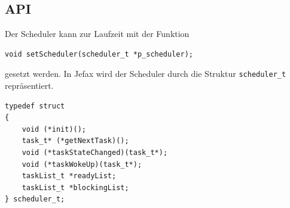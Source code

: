 \documentclass[fontsize=12pt, toc=bibliography, notitlepage]{scrreprt}
\begin{document}
\subsection{API}
\label{subsec:scheduler-api}
Der Scheduler kann zur Laufzeit mit der Funktion

\begin{lstlisting}[title=scheduler.h]
void setScheduler(scheduler_t *p_scheduler);
\end{lstlisting}

gesetzt werden. In Jefax wird der Scheduler durch die Struktur \lstinline$scheduler_t$ repräsentiert.

\begin{lstlisting}[title=scheduler.h]
typedef struct
{
	void (*init)();
	task_t* (*getNextTask)();
	void (*taskStateChanged)(task_t*);
	void (*taskWokeUp)(task_t*);
	taskList_t *readyList;
	taskList_t *blockingList;
} scheduler_t;
\end{lstlisting}
\end{document}
